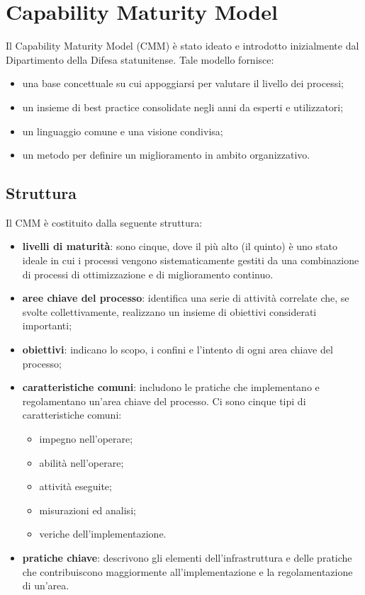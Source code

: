 \documentclass[PianoDiQualifica.tex]{subfiles}
\begin{document}
\section{Capability Maturity Model}
	Il Capability Maturity Model (CMM) è stato ideato e introdotto inizialmente dal Dipartimento della Difesa statunitense. Tale modello
	fornisce:
	\begin{itemize}
		\item una base concettuale su cui appoggiarsi per valutare il livello dei processi;
		\item un insieme di best practice consolidate negli anni da esperti e utilizzatori;
		\item un linguaggio comune e una visione condivisa;
		\item un metodo per definire un miglioramento in ambito organizzativo.
	\end{itemize}
	\subsection{Struttura}
	Il CMM è costituito dalla seguente struttura:
	\begin{itemize}
		\item \textbf{livelli di maturità}: sono cinque, dove il più alto (il quinto) è uno stato ideale in cui i processi vengono sistematicamente
		gestiti da una combinazione di processi di ottimizzazione e di miglioramento continuo. 
		\item \textbf{aree chiave del processo}: identifica una serie di attività correlate che, se svolte collettivamente,
		realizzano un insieme di obiettivi considerati importanti;
		\item \textbf{obiettivi}: indicano lo scopo, i confini e l'intento di ogni area chiave del processo;
		\item \textbf{caratteristiche comuni}: includono le pratiche che implementano e regolamentano un'area chiave del processo. Ci sono cinque
		tipi di caratteristiche comuni:
		\begin{itemize}
			\item impegno nell'operare;
			\item abilità nell'operare;
			\item attività eseguite;
			\item misurazioni ed analisi;
			\item veriche dell'implementazione.
		\end{itemize}
		\item \textbf{pratiche chiave}: descrivono gli elementi dell'infrastruttura e delle pratiche che contribuiscono maggiormente all'implementazione
		e la regolamentazione di un'area.
	\end{itemize}
	
\end{document}
